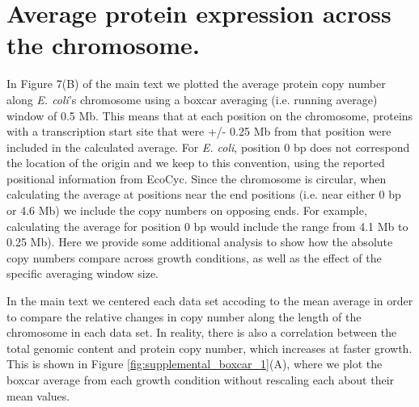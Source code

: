 \section{Average protein expression across the chromosome.}

In Figure 7(B) of the main text we plotted the average protein copy number along
\textit{E. coli}'s chromosome using a boxcar averaging (i.e. running average)
window of 0.5 Mb. This means that at each position on the chromosome, proteins
with a transcription start site that were +/- 0.25 Mb from that position
were  included in the calculated average. For \textit{E. coli},
position 0 bp does not correspond the location of the origin and we  keep to
this convention, using the reported positional information from EcoCyc. Since
the chromosome is circular, when calculating the  average at positions  near the
end positions (i.e. near either 0 bp or 4.6 Mb) we include the copy numbers
on opposing ends.  For example, calculating the average for position 0 bp would
include the range from 4.1 Mb to 0.25 Mb).  Here we provide some additional
analysis to show how the absolute copy numbers compare across growth conditions,
as well as the effect of the specific averaging window size.

In the main text we centered each data set accoding to the mean average in order
to  compare the relative changes in copy number along the length of the
chromosome in each data set. In reality, there is also a correlation between the
total genomic content and protein copy number, which increases at faster growth.
This is shown in Figure \ref{fig:supplemental_boxcar_1}(A), where we plot the boxcar average from each
growth condition without rescaling each about their mean values.

